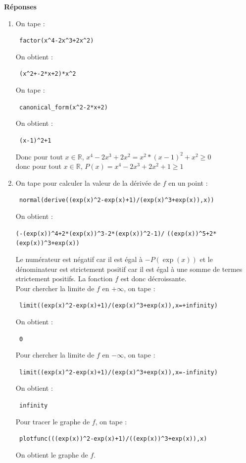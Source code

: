 \documentclass{article}
\begin{document}
{\bf R\'eponses}
\begin{enumerate}
\item
On tape :
\begin{center}
\verb| factor(x^4-2x^3+2x^2)|
\end{center}
On obtient :
\begin{center}
\verb| (x^2+-2*x+2)*x^2|
\end{center}
On tape :
\begin{center}
\verb| canonical_form(x^2-2*x+2)|
\end{center}
On obtient :
\begin{center}
\verb| (x-1)^2+1|
\end{center}
Donc pour tout $x \in \mathbb R$, $x^4-2x^3+2x^2=x^2*(x-1)^2+x^2 \geq 0$ \\
donc pour tout $x \in \mathbb R$, $P(x)=x^4-2x^3+2x^2+1 \geq 1$

\item 
On tape pour calculer la valeur de la d\'eriv\'ee de $f$ en un point :
\begin{center}\verb| normal(derive((exp(x)^2-exp(x)+1)/(exp(x)^3+exp(x)),x))|\end{center}
On obtient :
\begin{center}\verb|(-(exp(x))^4+2*(exp(x))^3-2*(exp(x))^2-1)/|
\verb|((exp(x))^5+2*(exp(x))^3+exp(x))|\end{center}

Le num\'erateur est n\'egatif car il est \'egal \`a $-P(\exp(x))$ et le 
d\'enominateur est strictement positif car il est \'egal \`a une somme de 
termes strictement positifs. La fonction $f$ est donc d\'ecroissante.\\
Pour chercher la limite de $f$ en $+\infty$, on tape :
\begin{center}
\verb| limit((exp(x)^2-exp(x)+1)/(exp(x)^3+exp(x)),x=+infinity)|
\end{center}
On obtient :
\begin{center}
\verb| 0|
\end{center}
Pour chercher la limite de $f$ en $-\infty$, on tape :
\begin{center}
\verb| limit((exp(x)^2-exp(x)+1)/(exp(x)^3+exp(x)),x=-infinity)|
\end{center}
On obtient :
\begin{center}
\verb| infinity|
\end{center}
Pour tracer le graphe de $f$, on tape :
\begin{center}
\verb| plotfunc(((exp(x))^2-exp(x)+1)/((exp(x))^3+exp(x)),x)|
\end{center}
On obtient le graphe de $f$.


\end{enumerate}
\end{document}
